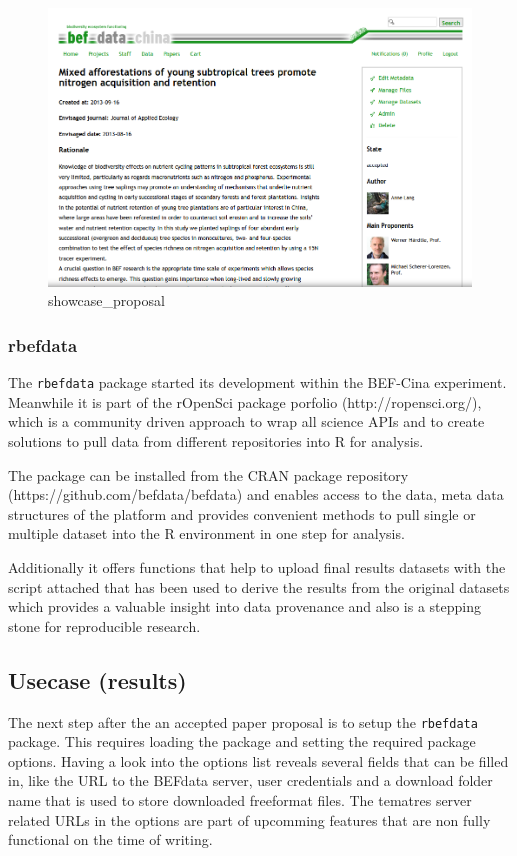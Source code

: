 \documentclass[]{article}
\makeatletter
\def\maxwidth{\ifdim\Gin@nat@width>\linewidth\linewidth
\else\Gin@nat@width\fi}
\let\Oldincludegraphics\includegraphics
\renewcommand{\includegraphics}[1]{\Oldincludegraphics[width=\maxwidth]{#1}}
\makeatother
\begin{document}
\begin{figure}[htbp]
\centering
\includegraphics{./figure/static/showcase_proposal.png}
\caption{showcase\_proposal}
\end{figure}

\subsubsection{rbefdata}

The \texttt{rbefdata} package started its development within the
BEF-Cina experiment. Meanwhile it is part of the rOpenSci package
porfolio (http://ropensci.org/), which is a community driven approach to
wrap all science APIs and to create solutions to pull data from
different repositories into R for analysis.

The package can be installed from the CRAN package repository
(https://github.com/befdata/befdata) and enables access to the data,
meta data structures of the platform and provides convenient methods to
pull single or multiple dataset into the R environment in one step for
analysis.

Additionally it offers functions that help to upload final results
datasets with the script attached that has been used to derive the
results from the original datasets which provides a valuable insight
into data provenance and also is a stepping stone for reproducible
research.

\subsection{Usecase (results)}

The next step after the an accepted paper proposal is to setup the
\texttt{rbefdata} package. This requires loading the package and setting
the required package options. Having a look into the options list
reveals several fields that can be filled in, like the URL to the
BEFdata server, user credentials and a download folder name that is used
to store downloaded freeformat files. The tematres server related URLs
in the options are part of upcomming features that are non fully
functional on the time of writing.
\end{document}
